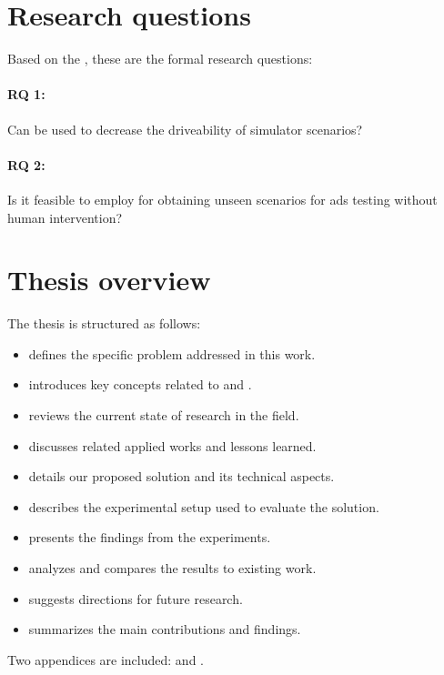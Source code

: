 \section{Research questions}

Based on the , these are the formal research questions:

\paragraph{RQ 1:} Can  be used to decrease the driveability of
 simulator scenarios?

\paragraph{RQ 2:} Is it feasible to employ  for obtaining unseen
scenarios for \acrshort{ads} testing without human intervention?

\section{Thesis overview}

The thesis is structured as follows:

\begin{itemize}
    \item {} defines the specific problem addressed in this work.
    \item {} introduces key concepts related to  and .
    \item {} reviews the current state of research in the field.
    \item {} discusses related applied works and lessons learned.
    \item {} details our proposed solution and its technical aspects.
    \item {} describes the experimental setup used to evaluate the solution.
    \item {} presents the findings from the experiments.
    \item {} analyzes and compares the results to existing work.
    \item {} suggests directions for future research.
    \item {} summarizes the main contributions and findings.
\end{itemize}

Two appendices are included:  and .
